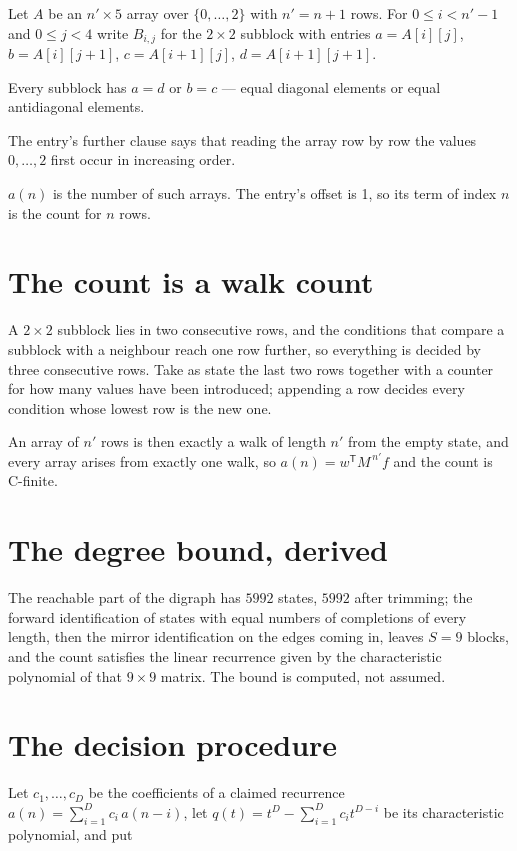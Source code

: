 \documentclass[11pt]{article}
\theoremstyle{definition}
\begin{document}
Let $A$ be an $n' \times 5$ array over $\{0,\dots,2\}$ with $n' = n + 1$ rows. For $0 \le i < n'-1$ and $0 \le j < 4$ write $B_{i,j}$ for the $2\times2$ subblock with entries $a = A[i][j]$, $b = A[i][j{+}1]$, $c = A[i{+}1][j]$, $d = A[i{+}1][j{+}1]$.

Every subblock has $a = d$ or $b = c$ --- equal diagonal elements or equal antidiagonal elements.

The entry's further clause says that reading the array row by row the values $0,\dots,2$ first occur in increasing order.

$a(n)$ is the number of such arrays. The entry's offset is 1, so its term of index $n$ is the count for $n$ rows.

\section{The count is a walk count}

A $2\times2$ subblock lies in two consecutive rows, and the conditions that compare a subblock with a neighbour reach one row further, so everything is decided by three consecutive rows. Take as state the last two rows together with a counter for how many values have been introduced; appending a row decides every condition whose lowest row is the new one.

An array of $n'$ rows is then exactly a walk of length $n'$ from the empty state, and every array arises from exactly one walk, so $a(n) = w^{\mathsf T}M^{\,n'}f$ and the count is C-finite.

\section{The degree bound, derived}

The reachable part of the digraph has $5992$ states, $5992$ after trimming; the forward identification of states with equal numbers of completions of every length, then the mirror identification on the edges coming in, leaves $S = 9$ blocks, and the count satisfies the linear recurrence given by the characteristic polynomial of that $9\times9$ matrix. The bound is computed, not assumed.

\section{The decision procedure}

Let $c_1,\dots,c_D$ be the coefficients of a claimed recurrence $a(n) = \sum_{i=1}^{D} c_i\,a(n-i)$, let $q(t) = t^{D} - \sum_{i=1}^{D} c_i t^{D-i}$ be its characteristic polynomial, and put
\end{document}
